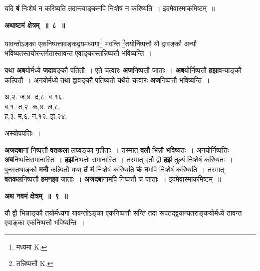 \documentclass[11pt, openany]{book}
\begin{document}
यदि \textbf{बं} निःशेषं न करिष्यति तदान्त्याङ्कमपि निःशेषं न करिष्यति~। इदमेवास्माकमिष्टम्~॥ 
\vspace{2mm}

\begin{center}
\textbf{\large अथाष्टमं क्षेत्रम्~॥~८~॥}
\end{center}

{\ab यावन्तोऽङ्का एकनिष्पत्तावङ्कद्वयमध्यगा\renewcommand{\thefootnote}{१}\footnote{मध्यमा {\en K.}} भवन्ति \renewcommand{\thefootnote}{२}\footnote{तन्निष्पत्तौ {\en K.}}तयोर्निष्पत्तौ यौ द्वावङ्कौ अन्यौ भविष्यतस्तयोरन्तर्गतास्तावन्त 
एवाङ्कास्तन्निष्पत्तौ भविष्यन्ति~। }

\begin{flushleft}
\begin{minipage}[t]{0.6\textwidth}
\hspace{4mm} यथा \textbf{अब}योर्मध्ये \textbf{जदा}वङ्कौ पतितौ~। एते चत्वारः \textbf{अज}निष्पत्तौ जाताः~। \textbf{अब}योर्निष्पत्तौ \textbf{हझा}वन्याङ्कौ कल्पितौ~। अनयोर्मध्ये तथा द्वावङ्कौ पतिष्यतो यथैते चत्वारः \textbf{अज}निष्पत्तौ भविष्यन्ति~।
\end{minipage} 
\hfill
\begin{minipage}[t]{0.3\textwidth}
अ,२. ज,४. द,८. ब,१६.\\
\noindent ब,१. त,२. क,४. ल,८. \\
\noindent ह,३. म,६. न,१२. झ,२४.
\end{minipage}
\end{flushleft}

\newpage
\begin{center}
अस्योपपत्तिः~।
\end{center}

\textbf{अजदबा}नां निष्पत्तौ \textbf{वतकला} लघ्वङ्का गृहीताः~। तस्मात् \textbf{वलौ} भिन्नौ भविष्यतः~। अनयोर्निष्पत्तिः \textbf{अब}निष्पत्तिसमानास्ति~। \textbf{हझ}निष्पत्तेः समानास्ति~। तस्मात् एतौ द्वौ \textbf{हझं} तुल्यं निःशेषं करिष्यतः~। पुनस्तथाङ्कौ \textbf{मनौ} कल्पितौ यथा \textbf{तं मं} निःशेषं करिष्यति \textbf{कं न}मपि निःशेषं करिष्यति~। तस्मात् \textbf{वतकल}निष्पत्तौ \textbf{हमनझा} जाताः~। \textbf{अजदबा}नामपि निष्पत्तौ च जाताः~। इदमेवास्माकमिष्टम्~॥ 
\vspace{2mm}

\begin{center}
\textbf{\large अथ नवमं क्षेत्रम्~॥~९~॥}
\end{center}

 {\ab यौ द्वौ भिन्नाङ्कौ तयोर्मध्यगा यावन्तोऽङ्का एकनिष्पत्तौ सन्ति तदा रूपतद्द्वयान्यतराङ्कयोर्मध्ये तावन्त एवाङ्का एकनिष्पत्तौ भविष्यन्ति~। }
 
\end{document}
